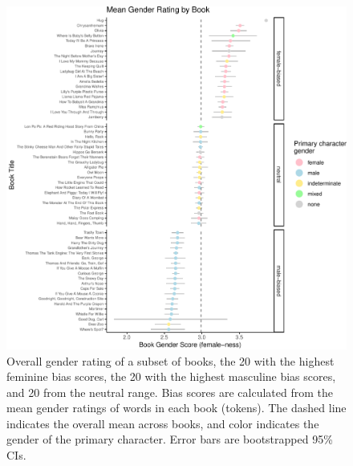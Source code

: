 \documentclass[
  english,
  ,man,floatsintext]{apa6}
\begin{document}
\begin{figure}[b]
\includegraphics{kidbookgender_psych_sci_files/figure-latex/bookforest-1} \caption{Overall gender rating of  a subset of books, the 20 with the highest feminine bias scores, the 20 with the highest masculine bias scores, and 20 from the neutral range. Bias scores are calculated from the mean gender ratings of words in each book (tokens). The dashed line indicates the overall mean across books, and color indicates the gender of the primary character. Error bars are bootstrapped 95\% CIs.}\label{fig:bookforest}
\end{figure}
\end{document}
